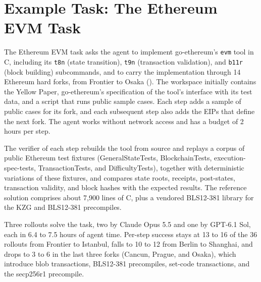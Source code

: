 \documentclass{article}
\begin{document}
\section{Example Task: The Ethereum EVM Task}
\label{app:evm}

The Ethereum EVM task asks the agent to implement go-ethereum's \texttt{evm}
tool in C, including its \texttt{t8n} (state transition), \texttt{t9n}
(transaction validation), and \texttt{b11r} (block building) subcommands, and
to carry the implementation through 14 Ethereum hard forks, from Frontier
to Osaka (). The workspace initially contains the Yellow Paper,
go-ethereum's specification of the tool's interface with its test data, and a
script that runs public sample cases. Each step adds a sample of public cases
for its fork, and each subsequent step also adds the EIPs that define the next
fork. The agent works
without network access and has a budget of 2 hours per step.

The verifier of each step rebuilds the tool from source and replays a corpus
of public Ethereum test fixtures (GeneralStateTests, BlockchainTests,
execution-spec-tests, TransactionTests, and DifficultyTests), together with deterministic variations
of these fixtures, and compares state roots, receipts, post-states, transaction
validity, and block hashes with the expected results. The reference solution
comprises about 7,900 lines of C, plus a vendored BLS12-381 library for the KZG
and BLS12-381 precompiles.

Three rollouts solve the task, two by Claude Opus 5.5 and one by GPT-6.1 Sol,
each in 6.4 to 7.5 hours of agent time. Per-step success stays at 13 to 16
of the 36 rollouts from Frontier to Istanbul, falls to 10 to 12 from Berlin to
Shanghai, and drops to 3 to 6 in the last three forks (Cancun, Prague, and
Osaka), which introduce blob transactions, BLS12-381 precompiles, set-code
transactions, and the secp256r1 precompile.
\end{document}
